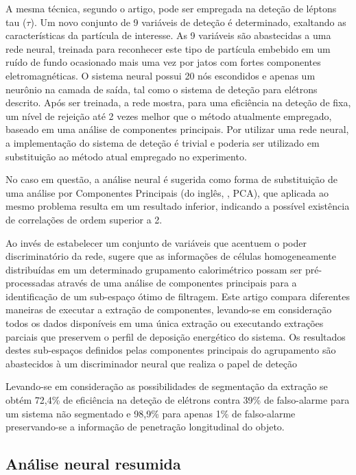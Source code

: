 A mesma técnica, segundo o artigo, pode ser empregada na deteção de léptons
tau ($\tau$). Um novo conjunto de 9 variáveis de deteção é determinado,
exaltando as características da partícula de interesse. As 9 variáveis são
abastecidas a uma rede neural, treinada para reconhecer este tipo de partícula
embebido em um ruído de fundo ocasionado mais uma vez por jatos com fortes
componentes eletromagnéticas. O sistema neural possui 20 nós escondidos e
apenas um neurônio na camada de saída, tal como o sistema de deteção para
elétrons descrito. Após ser treinada, a rede mostra, para uma eficiência na
deteção de  fixa, um nível de rejeição até 2 vezes melhor que o
método atualmente empregado, baseado em uma análise de componentes
principais. Por utilizar uma rede neural, a implementação do sistema de
deteção é trivial e poderia ser utilizado em substituição ao método atual
empregado no experimento.

No caso em questão, a análise neural é sugerida como forma de substituição de
uma análise por Componentes Principais (do inglês, , PCA), que aplicada ao mesmo problema resulta em um resultado
inferior, indicando a possível existência de correlações de ordem superior a
2. 

Ao invés de estabelecer um conjunto de variáveis que acentuem o poder
discriminatório da rede, \cite{vassali-acat-2001} sugere que as informações de
células homogeneamente distribuídas em um determinado grupamento calorimétrico
possam ser pré-processadas através de uma análise de componentes principais
para a identificação de um sub-espaço ótimo de filtragem. Este artigo compara
diferentes maneiras de executar a extração de componentes, levando-se em
consideração todos os dados disponíveis em uma única extração ou executando
extrações parciais que preservem o perfil de deposição energético do
sistema. Os resultados destes sub-espaços definidos pelas componentes
principais do agrupamento são abastecidos à um discriminador neural que
realiza o papel de deteção

Levando-se em consideração as possibilidades de segmentação da extração
se obtém 72,4\% de eficiência na deteção de elétrons contra 39\% de
falso-alarme para um sistema não segmentado e 98,9\% para apenas 1\% de
falso-alarme preservando-se a informação de penetração longitudinal do objeto.

\subsection{Análise neural resumida}

